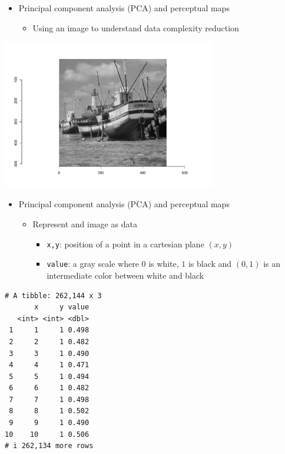 \documentclass[
  ignorenonframetext,
]{beamer}
\providecommand{\tightlist}{%
  \setlength{\itemsep}{0pt}\setlength{\parskip}{0pt}}\usepackage{longtable,booktabs,array}
\begin{document}
\begin{frame}{}
\label{section-24}
\begin{itemize}
\item
  Principal component analysis (PCA) and perceptual maps

  \begin{itemize}
  \tightlist
  \item
    Using an image to understand data complexity reduction
  \end{itemize}
\end{itemize}

\begin{center}
\includegraphics[width=0.7\textwidth,height=\textheight]{008_reducing_data_complexity_files/figure-beamer/unnamed-chunk-22-1.pdf}
\end{center}
\end{frame}

\begin{frame}[fragile]{}
\label{section-25}
\begin{itemize}
\item
  Principal component analysis (PCA) and perceptual maps

  \begin{itemize}
  \item
    Represent and image as data

    \begin{itemize}
    \tightlist
    \item
      \texttt{x,y}: position of a point in a cartesian plane \((x,y)\)
    \item
      \texttt{value}: a gray scale where \(0\) is white, \(1\) is black
      and \((0,1)\) is an intermediate color between white and black
    \end{itemize}
  \end{itemize}
\end{itemize}

\tiny

\begin{verbatim}
# A tibble: 262,144 x 3
       x     y value
   <int> <int> <dbl>
 1     1     1 0.498
 2     2     1 0.482
 3     3     1 0.490
 4     4     1 0.471
 5     5     1 0.494
 6     6     1 0.482
 7     7     1 0.498
 8     8     1 0.502
 9     9     1 0.490
10    10     1 0.506
# i 262,134 more rows
\end{verbatim}
\end{frame}
\end{document}
